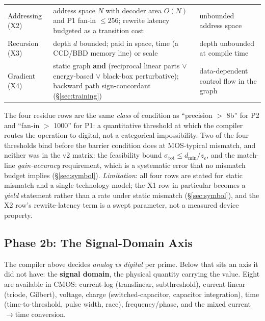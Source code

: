 \documentclass[11pt]{article}
\begin{document}
\begin{table}[h]
\begin{tabular}{p{1.9cm}p{6.6cm}p{5.6cm}}
Addressing (X2) & address space $N$ with decoder area $O(N)$ and P1 fan-in $\le 256$; rewrite latency budgeted as a transition cost & unbounded address space \\
Recursion (X3) & depth $d$ bounded; paid in space, time (a CCD/BBD memory line) or scale & depth unbounded at compile time \\
Gradient (X4) & static graph \textbf{and} (reciprocal linear parts $\vee$ energy-based $\vee$ black-box perturbative); backward path sign-concordant (\S\ref{sec:training}) & data-dependent control flow in the graph \\
\bottomrule
\end{tabular}
\end{table}

The four residue rows are the same \textit{class} of condition as ``precision $>$ 8b'' for P2 and ``fan-in $>$ 1000'' for P1: a quantitative threshold at which the compiler routes the operation to digital, not a categorical impossibility. Two of the four thresholds bind before the barrier condition does at MOS-typical mismatch, and neither was in the v2 matrix: the feasibility bound $\sigma_{\mathrm{tot}} \le d_{\min}/z_\varepsilon$, and the match-line \textit{gain-accuracy} requirement, which is a systematic error that no mismatch budget implies (\S\ref{sec:symbol}). \textit{Limitation}: all four rows are stated for static mismatch and a single technology model; the X1 row in particular becomes a \textit{yield} statement rather than a rate under static mismatch (\S\ref{sec:symbol}), and the X2 row's rewrite-latency term is a swept parameter, not a measured device property.

\subsection{Phase 2b: The Signal-Domain Axis}
\label{sec:domain}

The compiler above decides \textit{analog vs digital} per prime. Below that sits an axis it did not have: the \textbf{signal domain}, the physical quantity carrying the value. Eight are available in CMOS: current-log (translinear, subthreshold), current-linear (triode, Gilbert), voltage, charge (switched-capacitor, capacitor integration), time (time-to-threshold, pulse width, race), frequency/phase, and the mixed current$\to$time conversion.
\end{document}
